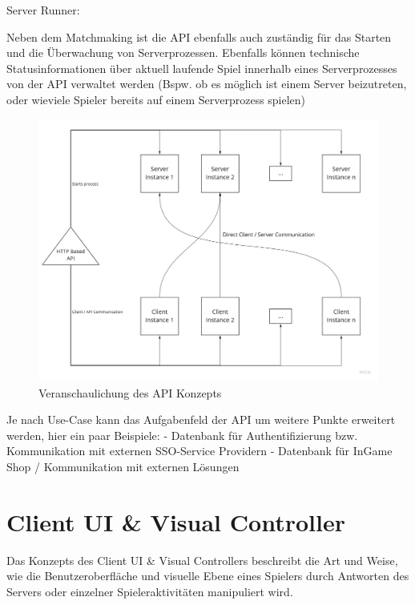Server Runner:

Neben dem Matchmaking ist die API ebenfalls auch zuständig für das Starten und die Überwachung von Serverprozessen.
Ebenfalls können technische Statusinformationen über aktuell laufende Spiel innerhalb eines Serverprozesses von der API verwaltet werden (Bspw. ob es möglich ist einem Server beizutreten, oder wieviele Spieler bereits auf einem Serverprozess spielen)

\begin{figure}
	\centering
	\includegraphics[width=150mm]{images/API_Konzept_Diagramm.jpg}
	\caption[API Konzept Diagramm]{Veranschaulichung des API Konzepts}
	\label{pic:API_Konzept_Diagramm}
\end{figure}


Je nach Use-Case kann das Aufgabenfeld der API um weitere Punkte erweitert werden, hier ein paar Beispiele:
- Datenbank für Authentifizierung bzw. Kommunikation mit externen SSO-Service Providern \cite{Wikipedia.2021c} 
- Datenbank für InGame Shop / Kommunikation mit externen Lösungen


\section{Client UI \& Visual Controller}

Das Konzepts des Client UI \& Visual Controllers beschreibt die Art und Weise, wie die Benutzeroberfläche und visuelle Ebene eines Spielers durch Antworten des Servers oder einzelner Spieleraktivitäten manipuliert wird.

